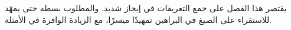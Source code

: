 \documentclass[../../../include/open-logic-chapter]{subfiles}
\begin{document}

\begin{editorial}
  يقتصر هذا الفصل على جمع التعريفات في إيجاز شديد. والمطلوب بسطه حتى يمهّد للاستقراء على الصيغ في البراهين تمهيدًا ميسرًا، مع الزيادة الوافرة في الأمثلة.
\end{editorial}







\OLEndChapterHook
\end{document}
